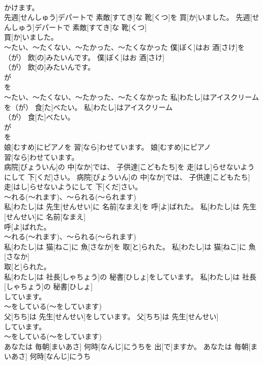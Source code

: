 \documentclass[8pt]{extreport}
\begin{document}
\begin{CJK}{UTF8}{min}
\\	かけます。	
\\	先週[せんしゅう]デパートで 素敵[すてき]な 靴[くつ]を 買[か]いました。	先週[せんしゅう]デパートで 素敵[すてき]な 靴[くつ]
\\	買[か]いました。	
\\	～たい、～たくない、～たかった、～たくなかった	僕[ぼく]はお 酒[さけ]を（が） 飲[の]みたいんです。	僕[ぼく]はお 酒[さけ]
\\	（が） 飲[の]みたいんです。	
\\	が 
\\	を 
\\	～たい、～たくない、～たかった、～たくなかった	私[わたし]はアイスクリームを（が） 食[た]べたい。	私[わたし]はアイスクリーム
\\	（が） 食[た]べたい。	
\\	が 
\\	を 
\\	娘[むすめ]にピアノを 習[なら]わせています。	娘[むすめ]にピアノ
\\	習[なら]わせています。	
\\	病院[びょういん]の 中[なか]では、 子供達[こどもたち]を 走[はし]らせないようにして 下[くだ]さい。	病院[びょういん]の 中[なか]では、 子供達[こどもたち]
\\	走[はし]らせないようにして 下[くだ]さい。	
\\	～れる(～れます)、～られる(～られます) 
\\	私[わたし]は 先生[せんせい]に 名前[なまえ]を 呼[よ]ばれた。	私[わたし]は 先生[せんせい]に 名前[なまえ]
\\	呼[よ]ばれた。	
\\	～れる(～れます)、～られる(～られます) 
\\	私[わたし]は 猫[ねこ]に 魚[さなか]を 取[と]られた。	私[わたし]は 猫[ねこ]に 魚[さなか]
\\	取[と]られた。	
\\	私[わたし]は 社長[しゃちょう]の 秘書[ひしょ]をしています。	私[わたし]は 社長[しゃちょう]の 秘書[ひしょ]
\\	しています。	
\\	～をしている(～をしています)
\\	父[ちち]は 先生[せんせい]をしています。	父[ちち]は 先生[せんせい]
\\	しています。	
\\	～をしている(～をしています)
\\	あなたは 毎朝[まいあさ] 何時[なんじ]にうちを 出[で]ますか。	あなたは 毎朝[まいあさ] 何時[なんじ]にうち

\end{CJK}
\end{document}
